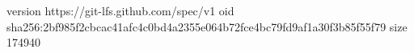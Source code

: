version https://git-lfs.github.com/spec/v1
oid sha256:2bf985f2cbcac41afc4c0bd4a2355e064b72fce4bc79fd9af1a30f3b85f55f79
size 174940
